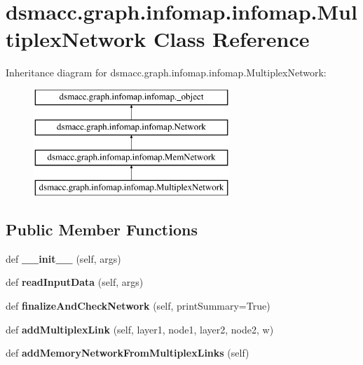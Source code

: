 \hypertarget{classdsmacc_1_1graph_1_1infomap_1_1infomap_1_1MultiplexNetwork}{}\section{dsmacc.\+graph.\+infomap.\+infomap.\+Multiplex\+Network Class Reference}
\label{classdsmacc_1_1graph_1_1infomap_1_1infomap_1_1MultiplexNetwork}
Inheritance diagram for dsmacc.\+graph.\+infomap.\+infomap.\+Multiplex\+Network\+:\begin{figure}[H]
\begin{center}
\leavevmode
\includegraphics[height=4.000000cm]{classdsmacc_1_1graph_1_1infomap_1_1infomap_1_1MultiplexNetwork}
\end{center}
\end{figure}
\subsection*{Public Member Functions}
\begin{DoxyCompactItemize}
\item 
\mbox{\label{classdsmacc_1_1graph_1_1infomap_1_1infomap_1_1MultiplexNetwork_af3aa05d3490aa202b63e69595c02f4aa}} 
def {\bfseries \+\_\+\+\_\+init\+\_\+\+\_\+} (self, args)
\item 
\mbox{\label{classdsmacc_1_1graph_1_1infomap_1_1infomap_1_1MultiplexNetwork_a01671aa7c576858bb24009163a8d8d85}} 
def {\bfseries read\+Input\+Data} (self, args)
\item 
\mbox{\label{classdsmacc_1_1graph_1_1infomap_1_1infomap_1_1MultiplexNetwork_af305855cf949b7727f8e06fde2a32ea1}} 
def {\bfseries finalize\+And\+Check\+Network} (self, print\+Summary=True)
\item 
\mbox{\label{classdsmacc_1_1graph_1_1infomap_1_1infomap_1_1MultiplexNetwork_a56032d47af60459d876ee0f07e26147c}} 
def {\bfseries add\+Multiplex\+Link} (self, layer1, node1, layer2, node2, w)
\item 
\mbox{\label{classdsmacc_1_1graph_1_1infomap_1_1infomap_1_1MultiplexNetwork_a94889b61de9545f133fff001fa74a369}} 
def {\bfseries add\+Memory\+Network\+From\+Multiplex\+Links} (self)
\end{DoxyCompactItemize}
